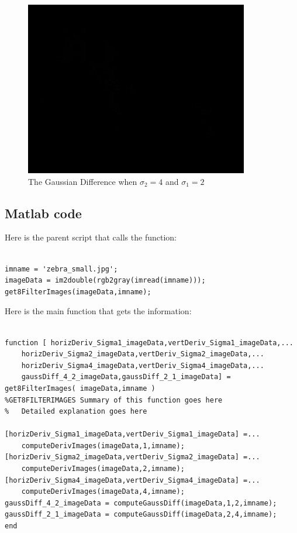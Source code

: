\documentclass[11pt,psfig]{article}
\begin{document}
\begin{figure}[H]
\centering
\includegraphics[height=3in]{sigma2_4_sigma1_2_gaussDiff_zebra_small.jpg}
\caption{The Gaussian Difference when $\sigma_2=4$ and $\sigma_1=2$}
\end{figure}

\subsection*{Matlab code}

Here is the parent script that calls the function:

\begin{verbatim}

imname = 'zebra_small.jpg';
imageData = im2double(rgb2gray(imread(imname)));
get8FilterImages(imageData,imname);

\end{verbatim}

Here is the main function that gets the information:

\begin{verbatim}

function [ horizDeriv_Sigma1_imageData,vertDeriv_Sigma1_imageData,...
    horizDeriv_Sigma2_imageData,vertDeriv_Sigma2_imageData,...
    horizDeriv_Sigma4_imageData,vertDeriv_Sigma4_imageData,...
    gaussDiff_4_2_imageData,gaussDiff_2_1_imageData] = get8FilterImages( imageData,imname )
%GET8FILTERIMAGES Summary of this function goes here
%   Detailed explanation goes here

[horizDeriv_Sigma1_imageData,vertDeriv_Sigma1_imageData] =...
    computeDerivImages(imageData,1,imname);
[horizDeriv_Sigma2_imageData,vertDeriv_Sigma2_imageData] =...
    computeDerivImages(imageData,2,imname);
[horizDeriv_Sigma4_imageData,vertDeriv_Sigma4_imageData] =...
    computeDerivImages(imageData,4,imname);
gaussDiff_4_2_imageData = computeGaussDiff(imageData,1,2,imname);
gaussDiff_2_1_imageData = computeGaussDiff(imageData,2,4,imname);
end

\end{verbatim}
\end{document}
